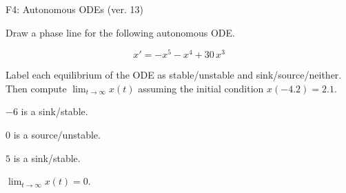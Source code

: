 \begin{exercise}
  \begin{exerciseTitle}F4: Autonomous ODEs (ver. 13)\end{exerciseTitle}
  \begin{exerciseStatement}
    

      Draw a phase line for the following 
      autonomous ODE.
    

    
\[x'= -x^{5} - x^{4} + 30 \, x^{3}\]

    

      Label each equilibrium of the ODE
      as stable/unstable and sink/source/neither.
      Then compute \(\lim_{t\to\infty}x(t)\)
      assuming the initial condition
      \(x( -4.2 )= 2.1\).
    

  \end{exerciseStatement}
  \begin{exerciseAnswer}
    

      \(-6\) is a sink/stable.
      
        \(0\) is a source/unstable.
      
      \(5\) is a sink/stable.
    

    

      \(\lim_{t\to\infty}x(t)=0\).
    

  \end{exerciseAnswer}
\end{exercise}